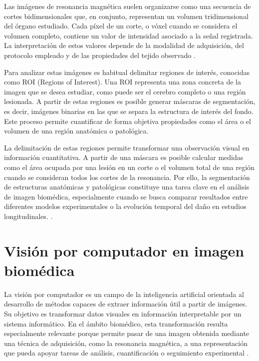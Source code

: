 Las imágenes de resonancia magnética suelen organizarse como una secuencia de cortes bidimensionales que, en conjunto, representan un volumen tridimensional del órgano estudiado. Cada píxel de un corte, o vóxel cuando se considera el volumen completo, contiene un valor de intensidad asociado a la señal registrada. La interpretación de estos valores depende de la modalidad de adquisición, del protocolo empleado y de las propiedades del tejido observado \citep{ucm_imagej_manual}.

Para analizar estas imágenes es habitual delimitar regiones de interés, conocidas como ROI (Regions of Interest). Una ROI representa una zona concreta de la imagen que se desea estudiar, como puede ser el cerebro completo o una región lesionada. A partir de estas regiones es posible generar máscaras de segmentación, es decir, imágenes binarias en las que se separa la estructura de interés del fondo. Este proceso permite cuantificar de forma objetiva propiedades como el área o el volumen de una región anatómica o patológica.

La delimitación de estas regiones permite transformar una observación visual en información cuantitativa. A partir de una máscara es posible calcular medidas como el área ocupada por una lesión en un corte o el volumen total de una región cuando se consideran todos los cortes de la resonancia. Por ello, la segmentación de estructuras anatómicas y patológicas constituye una tarea clave en el análisis de imagen biomédica, especialmente cuando se busca comparar resultados entre diferentes modelos experimentales o la evolución temporal del daño en estudios longitudinales. \citep{litjens2017survey,hesamian2019deep}.

\section{Visión por computador en imagen biomédica}

La visión por computador es un campo de la inteligencia artificial orientada al desarrollo de métodos capaces de extraer información útil a partir de imágenes. Su objetivo es transformar datos visuales en información interpretable por un sistema informático. En el ámbito biomédico, esta transformación resulta especialmente relevante porque permite pasar de una imagen obtenida mediante una técnica de adquisición, como la resonancia magnética, a una representación que pueda apoyar tareas de análisis, cuantificación o seguimiento experimental \citep{litjens2017survey,shen2017deep}.

